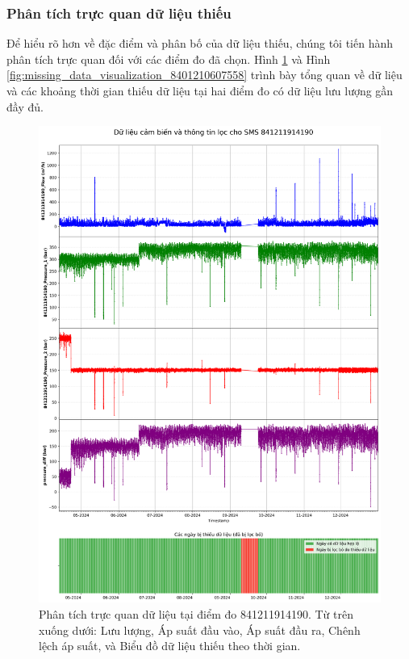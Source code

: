 \subsubsection{Phân tích trực quan dữ liệu thiếu}

Để hiểu rõ hơn về đặc điểm và phân bố của dữ liệu thiếu, chúng tôi tiến hành phân tích trực quan đối với các điểm đo đã chọn. Hình \ref{fig:missing_data_visualization_841211914190} và Hình \ref{fig:missing_data_visualization_8401210607558} trình bày tổng quan về dữ liệu và các khoảng thời gian thiếu dữ liệu tại hai điểm đo có dữ liệu lưu lượng gần đầy đủ.

\begin{figure}[H]
    \centering
    \includegraphics[width=\textwidth]{image/section6_1/timeseries_combined_841211914190.png}
    \caption{Phân tích trực quan dữ liệu tại điểm đo 841211914190. Từ trên xuống dưới: Lưu lượng, Áp suất đầu vào, Áp suất đầu ra, Chênh lệch áp suất, và Biểu đồ dữ liệu thiếu theo thời gian.}
    \label{fig:missing_data_visualization_841211914190}
\end{figure}

